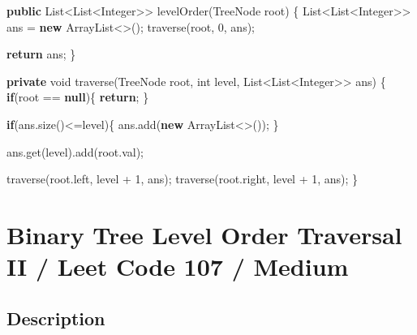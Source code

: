 \documentclass[]{book}
\newenvironment{Shaded}{\begin{snugshade}}{\end{snugshade}}
\newcommand{\BuiltInTok}[1]{#1}
\newcommand{\DataTypeTok}[1]{\textcolor[rgb]{0.13,0.29,0.53}{#1}}
\newcommand{\DecValTok}[1]{\textcolor[rgb]{0.00,0.00,0.81}{#1}}
\newcommand{\FunctionTok}[1]{\textcolor[rgb]{0.00,0.00,0.00}{#1}}
\newcommand{\KeywordTok}[1]{\textcolor[rgb]{0.13,0.29,0.53}{\textbf{#1}}}
\newcommand{\NormalTok}[1]{#1}
\begin{document}
\begin{Shaded}
\begin{Highlighting}[]
\KeywordTok{public} \BuiltInTok{List}\NormalTok{<}\BuiltInTok{List}\NormalTok{<}\BuiltInTok{Integer}\NormalTok{>> }\FunctionTok{levelOrder}\NormalTok{(}\BuiltInTok{TreeNode}\NormalTok{ root) \{}
    \BuiltInTok{List}\NormalTok{<}\BuiltInTok{List}\NormalTok{<}\BuiltInTok{Integer}\NormalTok{>> ans = }\KeywordTok{new} \BuiltInTok{ArrayList}\NormalTok{<>();}
    \FunctionTok{traverse}\NormalTok{(root, }\DecValTok{0}\NormalTok{, ans);}

    \KeywordTok{return}\NormalTok{ ans;}
\NormalTok{\}}

\KeywordTok{private} \DataTypeTok{void} \FunctionTok{traverse}\NormalTok{(}\BuiltInTok{TreeNode}\NormalTok{ root, }\DataTypeTok{int}\NormalTok{ level, }\BuiltInTok{List}\NormalTok{<}\BuiltInTok{List}\NormalTok{<}\BuiltInTok{Integer}\NormalTok{>> ans) \{}
    \KeywordTok{if}\NormalTok{(root == }\KeywordTok{null}\NormalTok{)\{}
        \KeywordTok{return}\NormalTok{;}
\NormalTok{    \}}

    \KeywordTok{if}\NormalTok{(ans.}\FunctionTok{size}\NormalTok{()<=level)\{}
\NormalTok{        ans.}\FunctionTok{add}\NormalTok{(}\KeywordTok{new} \BuiltInTok{ArrayList}\NormalTok{<>());}
\NormalTok{    \}}

\NormalTok{    ans.}\FunctionTok{get}\NormalTok{(level).}\FunctionTok{add}\NormalTok{(root.}\FunctionTok{val}\NormalTok{);}

    \FunctionTok{traverse}\NormalTok{(root.}\FunctionTok{left}\NormalTok{, level + }\DecValTok{1}\NormalTok{, ans);}
    \FunctionTok{traverse}\NormalTok{(root.}\FunctionTok{right}\NormalTok{, level + }\DecValTok{1}\NormalTok{, ans);}
\NormalTok{\}}
\end{Highlighting}
\end{Shaded}

\hypertarget{binary-tree-level-order-traversal-ii-leet-code-107-medium}{%
\section{Binary Tree Level Order Traversal II / Leet Code 107 / Medium}\label{binary-tree-level-order-traversal-ii-leet-code-107-medium}}

\hypertarget{description-55}{%
\subsection{Description}\label{description-55}}
\end{document}
